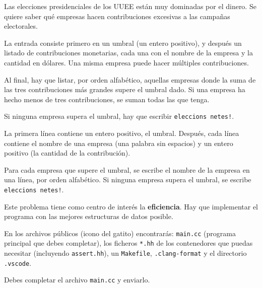 

\Statement

Las elecciones presidenciales de los UUEE están muy dominadas por el dinero. Se
quiere saber qué empresas hacen contribuciones excesivas a las
campañas electorales.

\medskip

La entrada consiste primero en un umbral (un entero positivo), y
después un listado de contribuciones monetarias, cada una con el
nombre de la empresa y la cantidad en dólares. Una misma empresa
puede hacer múltiples contribuciones.

\medskip

Al final, hay que listar, por orden alfabético, aquellas empresas
donde la suma de las tres contribuciones más grandes supere el
umbral dado. Si una empresa ha hecho menos de tres
contribuciones, se suman todas las que tenga.

\medskip

Si ninguna empresa supera el umbral, hay que escribir
\verb|eleccions netes!|.

\Input

La primera línea contiene un entero positivo, el umbral. Después,
cada línea contiene el nombre de una empresa (una palabra sin
espacios) y un entero positivo (la cantidad de la contribución).

\Output

Para cada empresa que supere el umbral, se escribe el nombre de
la empresa en una línea, por orden alfabético. Si ninguna empresa
supera el umbral, se escribe \verb|eleccions netes!|.

\Observation

Este problema tiene como centro de interés la
\textbf{eficiencia}. Hay que implementar el programa con las
mejores estructuras de datos posible.

\medskip

En los archivos públicos (icono del gatito) encontrarás:
\verb|main.cc| (programa principal que debes completar), los
ficheros \verb|*.hh| de los contenedores que puedas necesitar
(incluyendo \verb|assert.hh|), un \verb|Makefile|,
\verb|.clang-format| y el directorio \verb|.vscode|.

\medskip

Debes completar el archivo \verb|main.cc| y enviarlo.

\SampleTwoCol
